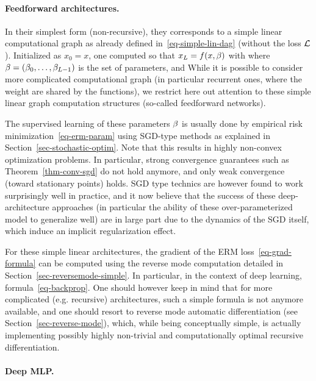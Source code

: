 \paragraph{Feedforward architectures.}

In their simplest form (non-recursive), they corresponds to a simple linear computational graph as already defined in~\eqref{eq-simple-lin-dag} (without the loss $\mathcal{L}$). Initialized as $x_0=x$, one computed
so that $x_L=f(x,\beta)$ with 
where $\beta=(\beta_0,\ldots,\beta_{L-1})$ is the set of parameters, and 
%
While it is possible to consider more complicated computational graph (in particular recurrent ones, where the weight are shared by the functions), we restrict here out attention to these simple linear graph computation structures (so-called feedforward networks).

The supervised learning of these parameters $\beta$ is usually done by empirical risk minimization~\eqref{eq-erm-param} using SGD-type methods as explained in Section~\ref{sec-stochastic-optim}. Note that this results in highly non-convex optimization problems. In particular, strong convergence guarantees such as Theorem~\ref{thm-conv-sgd} do not hold anymore, and only weak convergence (toward stationary points) holds. SGD type technics are however found to work surprisingly well in practice, and it now believe that the success of these deep-architecture approaches (in particular the ability of these over-parameterized model to generalize well) are in large part due to the dynamics of the SGD itself, which induce an implicit regularization effect. 

For these simple linear architectures, the gradient of the ERM loss~\eqref{eq-grad-formula} can be computed using the reverse mode computation detailed in Section~\ref{sec-reversemode-simple}. In particular, in the context of deep learning, formula~\eqref{eq-backprop}. One should however keep in mind that for more complicated (e.g. recursive) architectures, such a simple formula is not anymore available, and one should resort to reverse mode automatic differentiation (see Section~\ref{sec-reverse-mode}), which, while being conceptually simple, is actually implementing possibly highly non-trivial and computationally optimal recursive differentiation. 

\paragraph{Deep MLP.}

